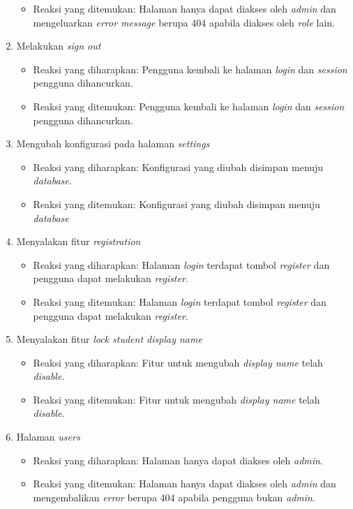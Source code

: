 \begin{enumerate}
\begin{itemize}
	 	\item Reaksi yang ditemukan: Halaman hanya dapat diakses oleh \textit{admin} dan mengeluarkan \textit{error message} berupa 404 apabila diakses oleh \textit{role} lain.
	 \end{itemize}
	 \item Melakukan \textit{sign out}
	 \begin{itemize}
	 	\item Reaksi yang diharapkan: Pengguna kembali ke halaman \textit{login} dan \textit{session} pengguna dihancurkan.
	 	\item Reaksi yang ditemukan: Pengguna kembali ke halaman \textit{login} dan \textit{session} pengguna dihancurkan.
	 \end{itemize}
	 \item Mengubah konfigurasi pada halaman \textit{settings}
	 \begin{itemize}
	 	\item Reaksi yang diharapkan: Konfigurasi yang diubah disimpan menuju \textit{database}.
	 	\item Reaksi yang ditemukan: Konfigurasi yang diubah disimpan menuju \textit{database}
	 \end{itemize}
	 \item Menyalakan fitur \textit{registration}
	 \begin{itemize}
	 	\item Reaksi yang diharapkan: Halaman \textit{login} terdapat tombol \textit{register} dan pengguna dapat melakukan \textit{register}.
	 	\item Reaksi yang ditemukan: Halaman \textit{login} terdapat tombol \textit{register} dan pengguna dapat melakukan \textit{register}.
	 \end{itemize}
	 \item Menyalakan fitur \textit{lock student display name}
	 \begin{itemize}
	 	\item Reaksi yang diharapkan: Fitur untuk mengubah \textit{display name} telah \textit{disable}.
	 	\item Reaksi yang ditemukan: Fitur untuk mengubah \textit{display name} telah \textit{disable}.
	 \end{itemize}
	 \item Halaman \textit{users}
	 \begin{itemize}
	 	\item Reaksi yang diharapkan: Halaman hanya dapat diakses oleh \textit{admin}.
	 	\item Reaksi yang ditemukan: Halaman hanya dapat diakses oleh \textit{admin} dan mengembalikan \textit{error} berupa 404 apabila pengguna bukan \textit{admin}.

\end{itemize}
\end{enumerate}
